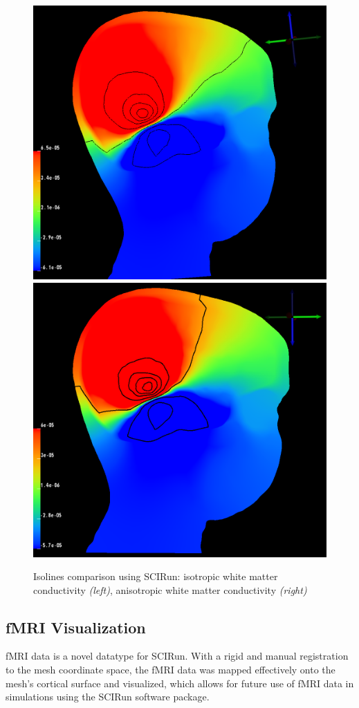 \begin{figure}[H]
\begin{center}
\includegraphics[width=.49\textwidth]{Figures/iso_isolines}
\includegraphics[width = .49\textwidth]{Figures/aniso_isolines}
\caption{Isolines comparison using SCIRun: isotropic white matter conductivity \textit{(left)}, anisotropic white matter conductivity \textit{(right)}}
\label{fig:isolines}
\end{center}
\end{figure}

\subsection{fMRI Visualization}

fMRI data is a novel datatype for SCIRun. With a rigid and manual registration to the mesh coordinate space, the fMRI data was mapped effectively onto the mesh's cortical surface and visualized, which allows for future use of fMRI data in simulations using the SCIRun software package.

